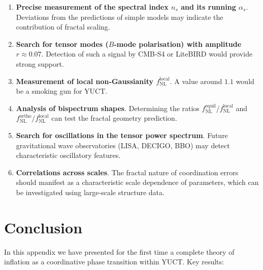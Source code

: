 \documentclass[12pt]{article}
\theoremstyle{remark}
\begin{document}
	\begin{enumerate}
		\item \textbf{Precise measurement of the spectral index $n_s$ and its running $\alpha_s$}. Deviations from the predictions of simple models may indicate the contribution of fractal scaling.
		\item \textbf{Search for tensor modes ($B$-mode polarisation) with amplitude $r \approx 0.07$}. Detection of such a signal by CMB‑S4 or LiteBIRD would provide strong support.
		\item \textbf{Measurement of local non‑Gaussianity $f_{\text{NL}}^{\text{local}}$}. A value around $1.1$ would be a smoking gun for YUCT.
		\item \textbf{Analysis of bispectrum shapes}. Determining the ratios $f_{\text{NL}}^{\text{equil}}/f_{\text{NL}}^{\text{local}}$ and $f_{\text{NL}}^{\text{ortho}}/f_{\text{NL}}^{\text{local}}$ can test the fractal geometry prediction.
		\item \textbf{Search for oscillations in the tensor power spectrum}. Future gravitational wave observatories (LISA, DECIGO, BBO) may detect characteristic oscillatory features.
		\item \textbf{Correlations across scales}. The fractal nature of coordination errors should manifest as a characteristic scale dependence of parameters, which can be investigated using large‑scale structure data.
	\end{enumerate}
	
	\section{Conclusion}
	\label{sec:conclusion}
	
	In this appendix we have presented for the first time a complete theory of inflation as a coordinative phase transition within YUCT. Key results:
	
\end{document}
